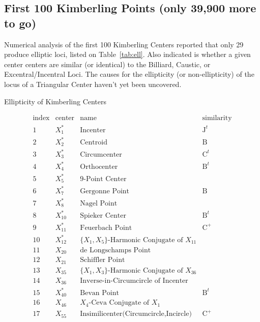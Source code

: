 \subsection{First 100 Kimberling Points (only 39,900 more to go)}

Numerical analysis of the first 100 Kimberling Centers \cite{etc} reported that only 29 produce elliptic loci, listed on Table~\ref{tab:ell}. Also indicated is whether a given center centers are similar (or identical) to the Billiard, Caustic, or Excentral/Incentral Loci. The causes for the ellipticity (or non-ellipticity) of the locus of a Triangular Center haven't yet been uncovered.

\begin{table}[ht]
\caption{Ellipticity of Kimberling Centers}
\label{tab:ell}
$$
\begin{array}{cclcc}
\text{index} & \text{center} & \text{name} & \text{similarity} \\
\hline
 1 & X_{1}^* & \text{Incenter} & \text{J}^t \\
 2 & X_{2}^* & \text{Centroid} & \text{B} \\
 3 & X_{3}^* & \text{Circumcenter} & \text{C}^t  \\
 4 & X_{4}^* & \text{Orthocenter} & \text{B}^t \\
 5 & X_{5}^* & \text{9-Point Center} &  \\
 6 & X_{7}^* & \text{Gergonne Point} & \text{B}\\
 7 & X_{8}^* & \text{Nagel Point} &  \\
 8 & X_{10}^* & \text{Spieker Center} & \text{B}^t\\
 9 & X_{11}^* & \text{Feuerbach Point} & \text{C}^+ \\
 10 & X_{12}^* & \text{$\{X_{1},X_{5}\}$-Harmonic Conjugate of $X_{11}$} & \\
 11 & X_{20} & \text{de Longschamps Point} & \\
 12 & X_{21} & \text{Schiffler Point} & \\
 13 & X_{35} & \text{$\{X_{1},X_{3}\}$-Harmonic Conjugate of $X_{36}$} & \\
 14 & X_{36} & \text{Inverse-in-Circumcircle of Incenter} & \\
 15 & X_{40}^* & \text{Bevan Point} & \text{B}^t \\
 16 & X_{46} & \text{$X_{4}$-Ceva Conjugate of $X_{1}$} & \\
 17 & X_{55} & \text{Insimilicenter(Circumcircle,Incircle)} & \text{C}^+\\

\end{array}$$
\end{table}
